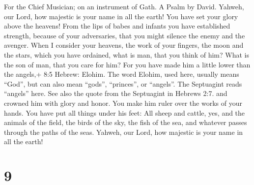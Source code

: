 For the Chief Musician; on an instrument of Gath. A Psalm by David.
 Yahweh, our Lord, how majestic is your name in all the
earth! You have set your glory above the heavens!  From the
lips of babes and infants you have established strength, because of your
adversaries, that you might silence the enemy and the avenger.
 When I consider your heavens, the work of your fingers, the
moon and the stars, which you have ordained,  what is man,
that you think of him? What is the son of man, that you care for him?
 For you have made him a little lower than the angels,+ 8:5
Hebrew: Elohim. The word Elohim, used here, usually means ``God'', but
can also mean ``gods'', ``princes'', or ``angels''. The Septuagint reads
``angels'' here. See also the quote from the Septuagint in Hebrews 2:7.
and crowned him with glory and honor.  You make him ruler
over the works of your hands. You have put all things under his feet:
 All sheep and cattle, yes, and the animals of the field,
 the birds of the sky, the fish of the sea, and whatever
passes through the paths of the seas.  Yahweh, our Lord, how
majestic is your name in all the earth!

\hypertarget{section-8}{%
\section{9}\label{section-8}}

